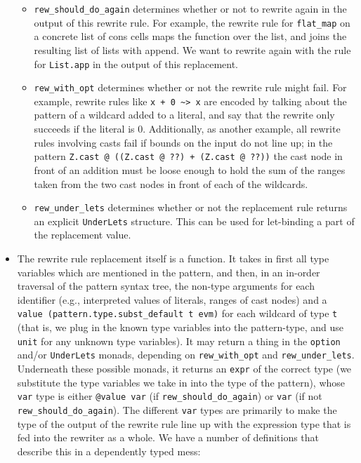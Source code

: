 \begin{itemize}
  \begin{itemize}
  \tightlist
  \item
    \texttt{rew\_should\_do\_again} determines whether or not to rewrite
    again in the output of this rewrite rule. For example, the rewrite
    rule for \texttt{flat\_map} on a concrete list of cons cells maps
    the function over the list, and joins the resulting list of lists
    with append. We want to rewrite again with the rule for
    \texttt{List.app} in the output of this replacement.
  \item
    \texttt{rew\_with\_opt} determines whether or not the rewrite rule
    might fail. For example, rewrite rules like
    \texttt{x\ +\ 0\ \textasciitilde{}\textgreater{}\ x} are encoded by
    talking about the pattern of a wildcard added to a literal, and say
    that the rewrite only succeeds if the literal is 0. Additionally, as
    another example, all rewrite rules involving casts fail if bounds on
    the input do not line up; in the pattern
    \texttt{Z.cast\ @\ ((Z.cast\ @\ ??)\ +\ (Z.cast\ @\ ??))} the cast
    node in front of an addition must be loose enough to hold the sum of
    the ranges taken from the two cast nodes in front of each of the
    wildcards.
  \item
    \texttt{rew\_under\_lets} determines whether or not the replacement
    rule returns an explicit \texttt{UnderLets} structure. This can be
    used for let-binding a part of the replacement value.
  \end{itemize}
\item
  The rewrite rule replacement itself is a function. It takes in first
  all type variables which are mentioned in the pattern, and then, in an
  in-order traversal of the pattern syntax tree, the non-type arguments
  for each identifier (e.g., interpreted values of literals, ranges of
  cast nodes) and a
  \texttt{value\ (pattern.type.subst\_default\ t\ evm)} for each
  wildcard of type \texttt{t} (that is, we plug in the known type
  variables into the pattern-type, and use \texttt{unit} for any unknown
  type variables). It may return a thing in the \texttt{option} and/or
  \texttt{UnderLets} monads, depending on \texttt{rew\_with\_opt} and
  \texttt{rew\_under\_lets}. Underneath these possible monads, it
  returns an \texttt{expr} of the correct type (we substitute the type
  variables we take in into the type of the pattern), whose \texttt{var}
  type is either \texttt{@value\ var} (if
  \texttt{rew\_should\_do\_again}) or \texttt{var} (if not
  \texttt{rew\_should\_do\_again}). The different \texttt{var} types are
  primarily to make the type of the output of the rewrite rule line up
  with the expression type that is fed into the rewriter as a whole. We
  have a number of definitions that describe this in a dependently typed
  mess:


\end{itemize}
